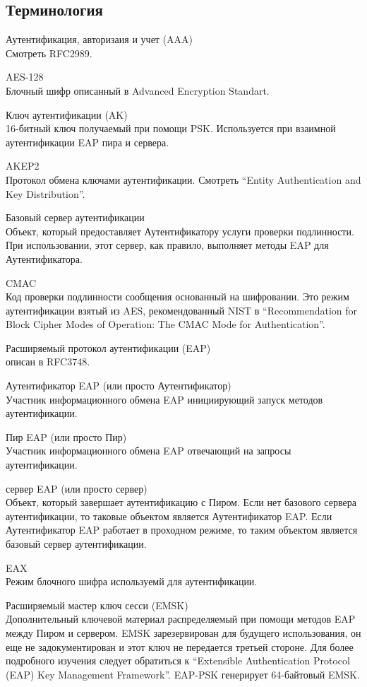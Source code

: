 \subsection{Терминология}

Аутентификация, авторизаия и учет (AAA) \\ Смотреть RFC2989.

AES-128 \\ Блочный шифр описанный в Advanced Encryption Standart.

Ключ аутентификации (AK) \\ 16-битный ключ получаемый при помощи PSK. Используется при взаимной аутентификации EAP пира и сервера.

AKEP2 \\ Протокол обмена ключами аутентификации. Смотреть ``Entity Authentication and Key Distribution''.

Базовый сервер аутентификации \\ Объект, который предоставляет Аутентификатору услуги проверки подлинности. При использовании, этот сервер, как правило, выполняет методы EAP для Аутентификатора.

CMAC \\ Код проверки подлинности сообщения основанный на шифровании. Это режим аутентификации взятый из AES, рекомендованный NIST в ``Recommendation for Block Cipher Modes of Operation: The CMAC Mode for Authentication''.

Расширяемый протокол аутентификации (EAP) \\ описан в RFC3748.

Аутентификатор EAP (или просто Аутентификатор) \\ Участник информационного обмена EAP инициирующий запуск методов аутентификации.

Пир EAP (или просто Пир) \\ Участник информационного обмена EAP отвечающий на запросы аутентификации.

сервер EAP (или просто сервер) \\ Объект, который завершает аутентификацию с Пиром. Если нет базового сервера аутентификации, то таковые объектом является Аутентификатор EAP. Если Аутентификатор EAP работает в проходном режиме, то таким объектом является базовый сервер аутентификации.

EAX \\ Режим блочного шифра используемй для аутентификации.

Расширяемый мастер ключ сесси (EMSK) \\ Дополнительный ключевой материал распределяемый при помощи методов EAP между Пиром и сервером. EMSK зарезервирован для будущего использования, он еще не задокументирован и этот ключ не передается третьей стороне. Для более подробного изучения следует обратиться к  ``Extensible Authentication Protocol (EAP) Key Management Framework''. EAP-PSK генерирует 64-байтовый EMSK.

